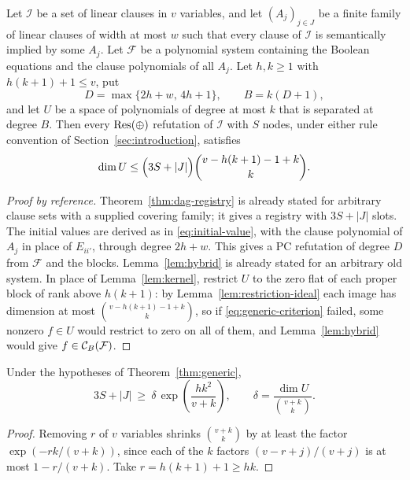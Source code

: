 \begin{theorem}\label{thm:generic}
Let \(\mathcal I\) be a set of linear clauses in \(v\) variables, and let
\((A_j)_{j\in J}\) be a finite family of linear clauses of width at most
\(w\) such that every clause of \(\mathcal I\) is semantically implied by
some \(A_j\). Let \(\mathcal F\) be a polynomial system containing the
Boolean equations and the clause polynomials of all \(A_j\). Let
\(h,k\ge1\) with \(h(k+1)+1\le v\), put
\[
 D=\max\{2h+w,\,4h+1\},\qquad B=k(D+1),
\]
and let \(U\) be a space of polynomials of degree at most \(k\) that is
separated at degree \(B\). Then every \(\mathrm{Res}(\oplus)\) refutation of \(\mathcal I\)
with \(S\) nodes, under either rule convention of
Section~\ref{sec:introduction}, satisfies
\begin{equation}\label{eq:generic-criterion}
 \dim U\le\Bigl(3S+|J|\Bigr)\binom{v-h(k+1)-1+k}{k}.
\end{equation}
\end{theorem}
\begin{proof}[Proof by reference]
Theorem~\ref{thm:dag-registry} is already stated for arbitrary clause sets
with a supplied covering family; it gives a registry with \(3S+|J|\) slots.
The initial values are derived as in \eqref{eq:initial-value}, with the
clause polynomial of \(A_j\) in place of \(E_{ii'}\), through degree
\(2h+w\). This gives a PC refutation of degree \(D\) from \(\mathcal F\)
and the blocks. Lemma~\ref{lem:hybrid} is already stated for an arbitrary
old system. In place of Lemma~\ref{lem:kernel}, restrict \(U\) to the zero
flat of each proper block of rank above \(h(k+1)\): by
Lemma~\ref{lem:restriction-ideal} each image has dimension at most
\(\binom{v-h(k+1)-1+k}{k}\), so if \eqref{eq:generic-criterion} failed,
some nonzero \(f\in U\) would restrict to zero on all of them, and
Lemma~\ref{lem:hybrid} would give \(f\in\mathcal C_B(\mathcal F)\).
\end{proof}

\begin{corollary}\label{cor:generic-density}
Under the hypotheses of Theorem~\ref{thm:generic},
\[
 3S+|J|\ \ge\ \delta\,\exp\!\left(\frac{hk^2}{v+k}\right),
 \qquad \delta=\frac{\dim U}{\binom{v+k}{k}} .
\]
\end{corollary}
\begin{proof}
Removing \(r\) of \(v\) variables shrinks \(\binom{v+k}{k}\) by at least the
factor \(\exp(-rk/(v+k))\), since each of the \(k\) factors
\((v-r+j)/(v+j)\) is at most \(1-r/(v+k)\). Take \(r=h(k+1)+1\ge hk\).
\end{proof}

